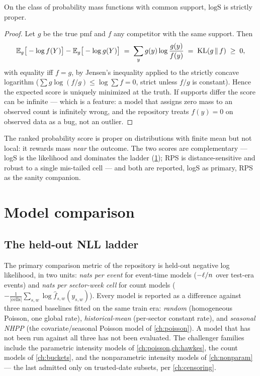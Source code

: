 \begin{proposition}\label{prop:ch07:logscore}
On the class of probability mass functions with common support,
$\mathrm{logS}$ is strictly proper.
\end{proposition}

\begin{proof}
Let $g$ be the true pmf and $f$ any competitor with the same support.
Then
\[
\mathbb{E}_g\big[-\log f(Y)\big] - \mathbb{E}_g\big[-\log g(Y)\big]
 \;=\; \sum_y g(y)\log\frac{g(y)}{f(y)}
 \;=\; \operatorname{KL}\!\left(g \,\middle\|\, f\right) \;\ge\; 0,
\]
with equality iff $f=g$, by Jensen's inequality applied to the strictly
concave logarithm ($\sum g\log(f/g) \le \log\sum f = 0$, strict unless
$f/g$ is constant). Hence the expected score is uniquely minimized at the
truth. If supports differ the score can be infinite --- which is a
feature: a model that assigns zero mass to an observed count is
infinitely wrong, and the repository treats $f(y)=0$ on observed data as
a bug, not an outlier.
\end{proof}

The ranked probability score is proper on distributions with finite mean
\citep{gneitingraftery2007,czado2009} but not local: it rewards mass
\emph{near} the outcome. The two scores are complementary --- logS is the
likelihood and dominates the ladder (\cref{ch07:sec:comparison}); RPS is
distance-sensitive and robust to a single mis-tailed cell --- and both are
reported, logS as primary, RPS as the sanity companion.

\section{Model comparison}\label{ch07:sec:comparison}

\subsection{The held-out NLL ladder}\label{ch07:sec:ladder}

The primary comparison metric of the repository is held-out negative log
likelihood, in two units: \emph{nats per event} for event-time models
($-\ell/n$ over test-era events) and \emph{nats per sector-week cell}
for count models ($-\frac{1}{|\text{cells}|}\sum_{s,w}\log
\hat f_{s,w}(y_{s,w})$). Every model is reported as a difference against
three named baselines fitted on the same train era: \emph{random}
(homogeneous Poisson, one global rate), \emph{historical-mean}
(per-sector constant rate), and \emph{seasonal NHPP} (the
covariate/seasonal Poisson model of \cref{ch:poisson}). A model that has
not been run against all three has not been evaluated. The challenger
families include the parametric intensity models of
\cref{ch:poisson,ch:hawkes}, the count models of \cref{ch:buckets}, and
the nonparametric intensity models of \cref{ch:nonparam} --- the last
admitted only on trusted-date subsets, per \cref{ch:censoring}.

